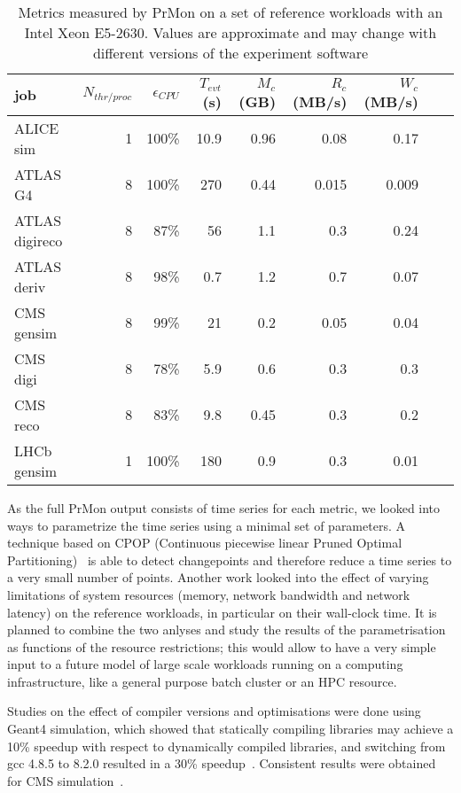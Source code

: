 \begin{table}
\centering
\caption{Metrics measured by PrMon on a set of reference workloads with an Intel Xeon E5-2630. Values are approximate and may change with different versions of the experiment software}
\label{table:prmon}
\begin{tabular}{lrrrrrrrr}
\hline
job & $N_{thr/proc}$ & $\epsilon_{CPU}$ & $T_{evt}$ (s) & $M_{c}$ (GB) & $R_{c}$ (MB/s) & $W_{c}$ (MB/s) \\\hline
ALICE sim & 1 & 100\% & 10.9 & 0.96 & 0.08 & 0.17 \\
ATLAS G4 & 8 & 100\% & 270 & 0.44 & 0.015 & 0.009 \\
ATLAS digireco & 8 & 87\% & 56 & 1.1 & 0.3 & 0.24 \\
ATLAS deriv & 8 & 98\% & 0.7 & 1.2 & 0.7 & 0.07 \\
CMS gensim & 8 & 99\% & 21 & 0.2 & 0.05 & 0.04 \\
CMS digi & 8 & 78\% & 5.9 & 0.6 & 0.3 & 0.3 \\
CMS reco & 8 & 83\% & 9.8 & 0.45 & 0.3 & 0.2 \\
LHCb gensim & 1 & 100\% & 180 & 0.9 & 0.3 & 0.01 \\\hline
\end{tabular}
\end{table}
As the full PrMon output consists of time series for each metric, we
looked into ways to parametrize the time series using a minimal set of
parameters. A technique based on CPOP (Continuous piecewise linear
Pruned Optimal Partitioning)~\cite{cpop} is able to detect
changepoints and therefore reduce a time series to a very small number
of points. Another work looked into the effect of varying limitations
of system resources (memory, network bandwidth and network latency) on
the reference workloads, in particular on their wall-clock time. It is
planned to combine the two anlyses and study the results of the
parametrisation as functions of the resource restrictions; this would
allow to have a very simple input to a future model of large scale
workloads running on a computing infrastructure, like a general
purpose batch cluster or an HPC resource.

Studies on the effect of compiler versions and optimisations were done
using Geant4 simulation, which showed that statically compiling
libraries may achieve a 10\% speedup with respect to dynamically
compiled libraries, and switching from gcc 4.8.5 to 8.2.0 resulted in
a 30\% speedup~\cite{marcon}. Consistent results were obtained for CMS
simulation~\cite{alejandro}.
